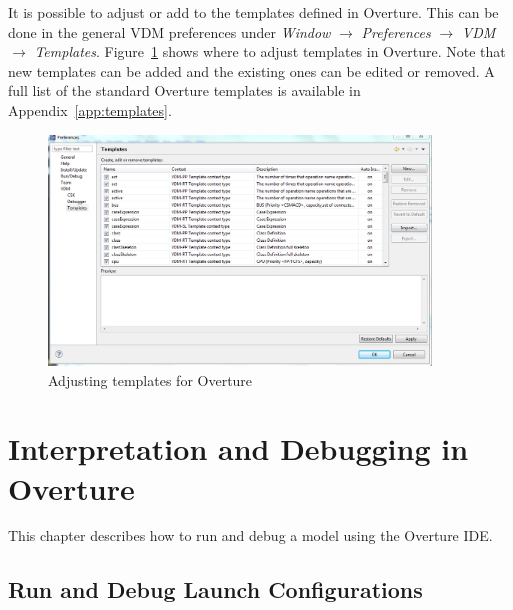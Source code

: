 \documentclass{overturerepchap}
\begin{document}
It is possible to adjust or add to the templates defined in
Overture. This can be done in the general VDM preferences under
\emph{Window} $\rightarrow$ \emph{Preferences} $\rightarrow$ \emph{VDM}
$\rightarrow$ \emph{Templates}. Figure~\ref{fig:Templatepreferences} shows
where to adjust templates in Overture. Note
that new templates can be added and the existing ones can be
edited or removed. A full list of the
standard Overture templates is available in Appendix~\ref{app:templates}.

\begin{figure}
\begin{center}
\includegraphics[width=4in]{screenDumps/templatesRT}
\caption{Adjusting templates for Overture}
\label{fig:Templatepreferences}
\end{center}
\end{figure}

\chapter{Interpretation and Debugging in Overture}\label{sec:debug}

This chapter describes how to run and debug a model using the Overture IDE.

\section{Run and Debug Launch Configurations}\label{sec:launchmodes}
\end{document}
